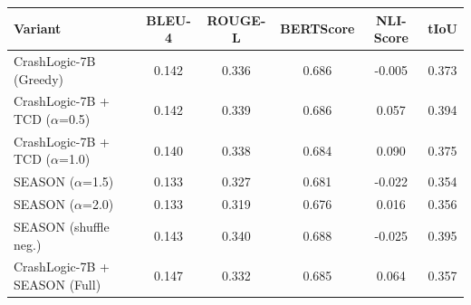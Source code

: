 \begin{tabular}{lccccc}
\toprule
Variant & BLEU-4 & ROUGE-L & BERTScore & NLI-Score & tIoU \\
\midrule
CrashLogic-7B (Greedy) & 0.142 & 0.336 & 0.686 & -0.005 & 0.373 \\
CrashLogic-7B + TCD ($\alpha$=0.5) & 0.142 & 0.339 & 0.686 & 0.057 & 0.394 \\
CrashLogic-7B + TCD ($\alpha$=1.0) & 0.140 & 0.338 & 0.684 & 0.090 & 0.375 \\
SEASON ($\alpha$=1.5) & 0.133 & 0.327 & 0.681 & -0.022 & 0.354 \\
SEASON ($\alpha$=2.0) & 0.133 & 0.319 & 0.676 & 0.016 & 0.356 \\
SEASON (shuffle neg.) & 0.143 & 0.340 & 0.688 & -0.025 & 0.395 \\
CrashLogic-7B + SEASON (Full) & 0.147 & 0.332 & 0.685 & 0.064 & 0.357 \\
\bottomrule
\end{tabular}
